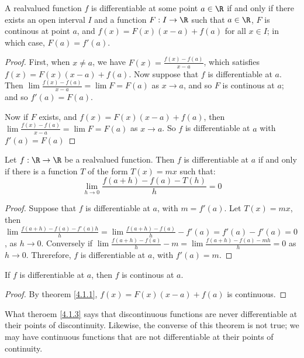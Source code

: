 \begin{theorem}\label{4.1.1}
    A realvalued function $f$ is differentiable at some point  $a \in \R$ if 
    and only if there exists an open interval  $I$ and a function  $F:I \rightarrow \R$ 
    such that  $a \in \R$,  $F$ is continous at point $a$, and  $f(x)=F(x)(x-a)+f(a)$ 
    for all  $x\in I$; in which case,  $F(a)=f'(a)$.
\end{theorem}
\begin{proof}
    First, when $x \neq a$, we have  $F(x)=\frac{f(x)-f(a)}{x-a}$, which satisfies 
    $f(x)=F(x)(x-a)+f(a)$. Now suppose that  $f$ is differentiable at  $a$. Then 
    $\lim{\frac{f(x)-f(a)}{x-a}}=\lim{F}=F(a)$ as $x \rightarrow a$, and so  $F$ is 
    continous at  $a$; and so  $f'(a)=F(a)$.

    Now if  $F$ exists, and  $f(x)=F(x)(x-a)+f(a)$, then  $\lim{\frac{f(x)-f(a)}{x-a}}= 
    \lim{F}=F(a)$ as $x \rightarrow a$. So  $f$ is differentiable at $a$ with $f'(a)=F(a)$
\end{proof}

\begin{theorem}\label{4.1.2}
    Let $f:\R \rightarrow \R$ be a realvalued function. Then $f$ is differentiable at  $a$ 
    if and only if there is a function  $T$ of the form  $T(x)=mx$ such that:
        \begin{equation}
            \lim_{h \rightarrow 0}{\frac{f(a+h)-f(a)-T(h)}{h}=0}
        \end{equation} 
\end{theorem}
\begin{proof}
    Suppose that $f$ is differentiable at  $a$, with  $m=f'(a)$. Let  $T(x)=mx$, then 
    $\lim{ \frac{f(a+h)-f(a)-f'(a)h}{h}}=\lim{\frac{f(a+h)-f(a)}{h}-f'(a)}=f'(a)-f'(a)=0$, 
    as $h \rightarrow 0$. Conversely if $\lim{\frac{f(a+h)-f(a)}{h}-m}=\lim{\frac{f(a+h)-f(a)-mh}{h}}=0$ 
    as $h \rightarrow 0$. Threrefore,  $f$ is differentiable at  $a$, with  $f'(a)=m$.
\end{proof}

\begin{theorem}\label{4.1.3}
    If $f$ is differentiable at  $a$, then  $f$ is continous at  $a$.
\end{theorem}
\begin{proof}
    By theorem \ref{4.1.1}, $f(x)=F(x)(x-a)+f(a)$ is continuous.		
\end{proof}

What theroem \ref{4.1.3} says that discontinuous functions are never differentiable at 
their points of discontinuity. Likewise, the converse of this theorem is not true; we may 
have continuous functions that are not differentiable at their points of continuity.

